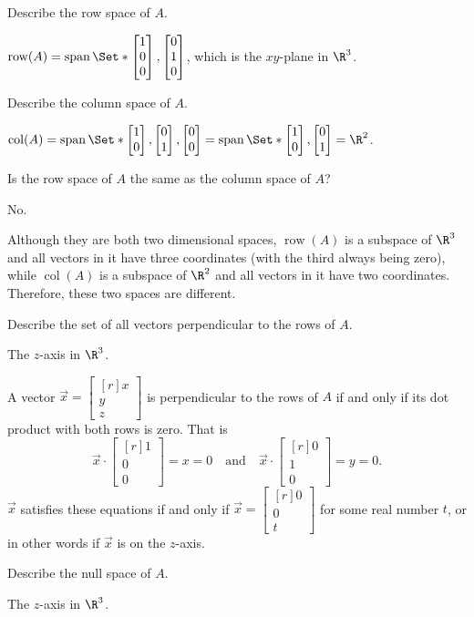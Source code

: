 \documentclass{problemset}
\DeclareMathOperator{\Span}{span}
\DeclareMathOperator{\Row}{row}
\DeclareMathOperator{\Col}{col}
\newcommand{\mat}[1]{\begin{bmatrix*}[r]#1\end{bmatrix*}}
\begin{document}
	\begin{parts}
		\item Describe the row space of $A$.
			\begin{solution}
				$\Row(A) = \Span\Set*{\mat{1\\0\\0},\mat{0\\1\\0}}$,
				which is the $xy$-plane in $\R^3$.
			\end{solution}
		\item Describe the column space of $A$.
			\begin{solution}
				$\Col(A)=\Span\Set*{\mat{1\\0},\mat{0\\1},\mat{0\\0}}
					=\Span\Set*{\mat{1\\0},\mat{0\\1}}=\R^2$.
			\end{solution}
		\item Is the row space of $A$ the same as the column space of $A$?
			\begin{solution}
				No.

				Although they are both two dimensional spaces, $\Row(A)$ is a
				subspace of $\R^3$ and all vectors in it have three coordinates
				(with the third always being zero), while $\Col(A)$ is a
				subspace of $\R^2$ and all vectors in it have two coordinates.
				Therefore, these two spaces are different.
			\end{solution}
		\item Describe the set of all vectors perpendicular to the rows of $A$.
			\begin{solution}
				The $z$-axis in $\R^3$.

				A vector $\vec x=\mat{x\\y\\z}$ is perpendicular to the rows of $A$
				if and only if its dot product with both rows is zero. That is
				\[
					\vec x\cdot\mat{1\\0\\0} = x = 0
					\quad \text{and} \quad
					\vec x\cdot\mat{0\\1\\0} = y = 0.
				\]
				$\vec x$ satisfies these equations if and only if $\vec x=\mat{0\\0\\t}$
				for some real number $t$, or in other words if $\vec x$ is on the
				$z$-axis.
			\end{solution}
		\item Describe the null space of $A$.
			\begin{solution}
				The $z$-axis in $\R^3$.


\end{solution}
\end{parts}
\end{document}
